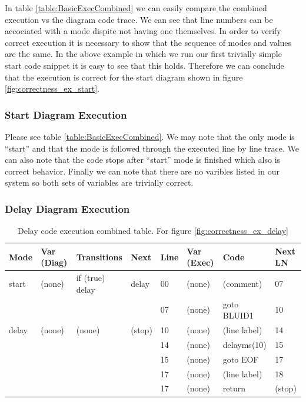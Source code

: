 In table \ref{table:BasicExecCombined} we can easily compare the combined execution vs the diagram code trace. 
We can see that line numbers can be accociated with a mode dispite not having one themselves. In order to verify 
correct execution it is necessary to show that the sequence of modes and values are the same. In the above example
 in which we run our first trivially simple start code snippet it is easy to see that this holds. Therefore we can
  conclude that the execution is correct for the start diagram shown in figure \ref{fig:correctness_ex_start}.

\subsubsection{Start Diagram Execution}

Please see table \ref{table:BasicExecCombined}. We may note that the only mode is ``start'' and that the mode
is followed through the executed line by line trace. We can also note that the code stops after ``start'' 
mode is finished which also is correct behavior. Finally we can note that there are no varibles listed in
our system so both sets of variables are trivially correct.

\subsubsection{Delay Diagram Execution}

\begin{table}[htcb]
	\caption{Delay code execution combined table. For figure \ref{fig:correctness_ex_delay}}
	\centering
	\tablefontsize
		\begin{tabular}{| p{} | p{} | p{} | p{} | p{} | p{} | p{} | p{} |}
			\hline
			\textbf{Mode} 		&	\textbf{Var (Diag)} 		& 	\textbf{Transitions} 		& 	\textbf{Next}		&	\textbf{Line}		&	\textbf{Var (Exec)	}	&	\textbf{Code}	&	\textbf{Next LN} \\
			\hline
			start 				&	(none)						&	if (true) delay				&	delay				&	00					&	(none)					& 	(comment)		&	07 \\
			\hline
								&								&								&						&	07					& 	(none)					& 	goto BLUID1		& 	10 \\
			\hline
			delay				&	(none)						&	(none)						&	(stop)				&	10					&	(none)					&	(line label)	&	14 \\
			\hline
								&								&								&						&	14					&	(none)					&	delayms(10)		&	15 \\
			\hline
								&								&								&						&	15					&	(none)					&	goto EOF		&	17 \\
			\hline
								&								&								&						&	17					&	(none)					&	(line label)	&	18 \\
			\hline
								&								&								&						&	17					&	(none)					&	return			&	(stop) \\
			\hline
		\end{tabular}
	\label{table:DelayExecCombined}
\end{table}

